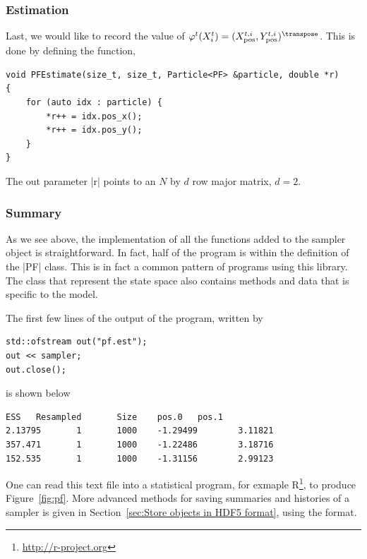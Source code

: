 \subsubsection{Estimation}

Last, we would like to record the value of $\varphi^t(X_i^t) =
(\xpos^{t,i},\ypos^{t,i})^{\transpose}$. This is done by defining the function,
\begin{Verbatim}
void PFEstimate(size_t, size_t, Particle<PF> &particle, double *r)
{
    for (auto idx : particle) {
        *r++ = idx.pos_x();
        *r++ = idx.pos_y();
    }
}
\end{Verbatim}
The out parameter |r| points to an $N$ by $d$ row major matrix, $d = 2$.

\subsubsection{Summary}

As we see above, the implementation of all the functions added to the sampler
object is straightforward. In fact, half of the program is within the
definition of the |PF| class. This is in fact a common pattern of programs
using this library. The class that represent the state space also contains
methods and data that is specific to the model.

The first few lines of the output of the program, written by
\begin{Verbatim}
std::ofstream out("pf.est");
out << sampler;
out.close();
\end{Verbatim}
is shown below
\begin{Verbatim}
ESS   Resampled       Size    pos.0   pos.1
2.13795       1       1000    -1.29499        3.11821
357.471       1       1000    -1.22486        3.18716
152.535       1       1000    -1.31156        2.99123
\end{Verbatim}
One can read this text file into a statistical program, for exmaple
R\footnote{\url{http://r-project.org}}, to produce Figure~\ref{fig:pf}. More
advanced methods for saving summaries and histories of a sampler is given in
Section~\ref{sec:Store objects in HDF5 format}, using the \hdf format.

